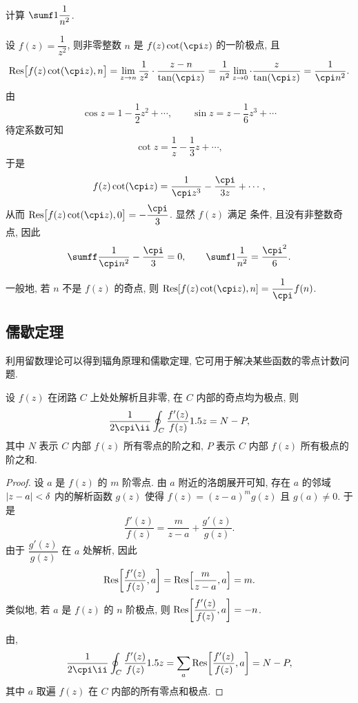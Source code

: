 \begin{example}\label{exam:bessel-question}
  计算 $\sumf1 \dfrac1{n^2}$.
\end{example}

\begin{solution}
  设 $f(z)=\dfrac1{z^2}$, 则非零整数 $n$ 是 $f(z)\cot(\cpi z)$ 的一阶极点, 且
  \[
     \Res\bigl[f(z)\cot(\cpi z),n\bigr]
    =\lim_{z\ra n}\frac1{z^2}\cdot\frac{z-n}{\tan(\cpi z)}
    =\frac1{n^2}\lim_{z\ra 0}\cdot\frac{z}{\tan(\cpi z)}
    =\frac1{\cpi n^2}.
  \]
  由
  \[
    \cos z=1-\dfrac12z^2+\cdots,\qquad
    \sin z=z-\dfrac16z^3+\cdots
  \]
  待定系数可知
  \[
     \cot z=\frac1z-\frac13z+\cdots,
  \]
  于是
  \[
     f(z)\cot(\cpi z)
    =\frac1{\cpi z^3}-\frac{\cpi}{3z}+\cdots,
  \]
  从而 $\Res\bigl[f(z)\cot(\cpi z),0\bigr]=-\dfrac\cpi3$.
  显然 $f(z)$ 满足 条件, 且没有非整数奇点, 因此
  \[
    \sumff \frac1{\cpi n^2}-\frac\cpi3=0,\qquad
    \sumf1 \frac1{n^2}=\frac{\cpi^2}6.
  \]
\end{solution}

一般地, 若 $n$ 不是 $f(z)$ 的奇点, 则 $\Res[f(z)\cot(\cpi z),n]=\dfrac1\cpi f(n)$.


\subsection{儒歇定理\optional}

利用留数理论可以得到辐角原理和儒歇定理, 它可用于解决某些函数的零点计数问题.

\begin{theorem}[辐角原理]
  \label{thm:log-f-derivative-sum-order}
  设 $f(z)$ 在闭路 $C$ 上处处解析且非零, 在 $C$ 内部的奇点均为极点, 则
  \[
    \frac1{2\cpi\ii}\oint_C \frac{f'(z)}{f(z)}\d z
    =N-P,
  \]
  其中 $N$ 表示 $C$ 内部 $f(z)$ 所有零点的阶之和, $P$ 表示 $C$ 内部 $f(z)$ 所有极点的阶之和.
\end{theorem}

\begin{proof}
  设 $a$ 是 $f(z)$ 的 $m$ 阶零点.
  由 $a$ 附近的洛朗展开可知, 存在 $a$ 的邻域 $\left|z-a\right|<\delta$ 内的解析函数 $g(z)$ 使得 $f(z)=(z-a)^mg(z)$ 且 $g(a)\neq 0$.
  于是
  \[
    \frac{f'(z)}{f(z)}=\frac m{z-a}+\frac{g'(z)}{g(z)}.
  \]
  由于 $\dfrac{g'(z)}{g(z)}$ 在 $a$ 处解析, 因此
  \[
     {\mathrm{Res}}\biggl[\frac{f'(z)}{f(z)},a\biggr]
    ={\mathrm{Res}}\Bigl[\frac m{z-a},a\Bigr]
    =m.
  \]
  类似地, 若 $a$ 是 $f(z)$ 的 $n$ 阶极点, 则 ${\mathrm{Res}}\biggl[\dfrac{f'(z)}{f(z)},a\biggr]=-n$.

  由\thmRes,
  \[
     \frac1{2\cpi\ii}\oint_C \frac{f'(z)}{f(z)}\d z
    =\sum_a\Res\biggl[\frac{f'(z)}{f(z)},a\biggr]=N-P,
  \]
  其中 $a$ 取遍 $f(z)$ 在 $C$ 内部的所有零点和极点.
\end{proof}

